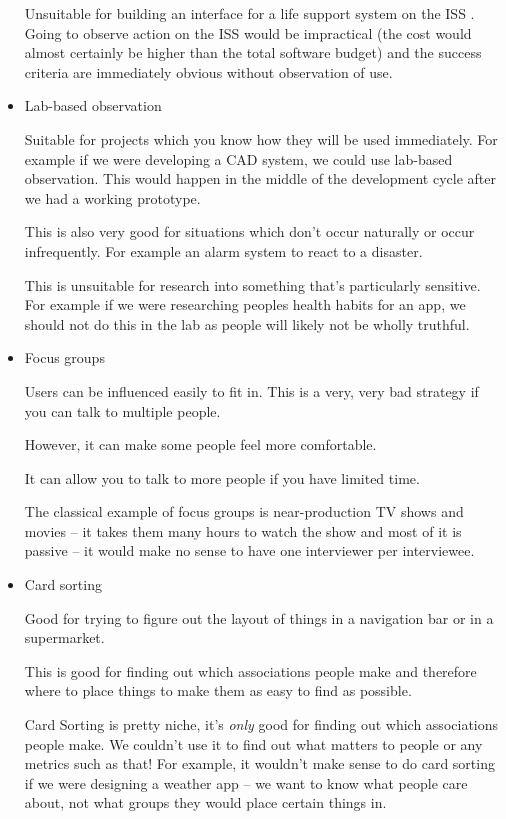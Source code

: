 \documentclass[10pt,\jkfside,a4paper]{article}
\begin{document}
\begin{itemize}
Unsuitable for building an interface for a life support system on the ISS .
Going to observe action on the ISS would be impractical (the cost would almost certainly be higher
than the total software budget) and the success criteria are immediately obvious without observation of use.

\item Lab-based observation

Suitable for projects which you know how they will be used immediately. For example if we were developing a CAD
system, we could use lab-based observation. This would happen in the middle of the development cycle after we had a
working prototype.

This is also very good for situations which don't occur naturally or occur infrequently.
For example an alarm system to react to a disaster.

This is unsuitable for research into something that's particularly sensitive. For example if we were researching
peoples health habits for an app, we should not do this in the lab as people will likely not be wholly truthful.

\item Focus groups

Users can be influenced easily to fit in.
This is a very, very bad strategy if you can talk to multiple people.

However, it can make some people feel more comfortable.

It can allow you to talk to more people if you have limited time.

The classical example of focus groups is near-production TV shows and movies -- it takes them many hours to watch the
show and most of it is passive -- it would make no sense to have one interviewer per interviewee.

\item Card sorting

Good for trying to figure out the layout of things in a navigation bar or in a supermarket.

This is good for finding out which associations people make and therefore where to place things to
make them as easy to find as possible.

Card Sorting is pretty niche, it's \textit{only} good for finding out which associations people make.
We couldn't use it to find out what matters to people or any metrics such as that!
For example, it wouldn't make sense to do card sorting if we were designing a weather app --
we want to know what people care about, not what groups they would place certain things in.

\end{itemize}
\end{document}
